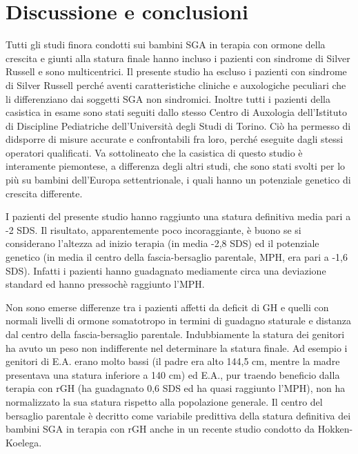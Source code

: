 \chapter{Discussione e conclusioni}


Tutti gli studi finora condotti sui bambini SGA in terapia con ormone della crescita e giunti alla statura finale hanno incluso i pazienti con sindrome di Silver Russell e sono multicentrici. Il presente studio ha escluso i pazienti con sindrome di Silver Russell perché aventi caratteristiche cliniche e auxologiche peculiari che li differenziano dai soggetti SGA non sindromici. Inoltre tutti i pazienti della casistica in esame sono stati seguiti dallo stesso Centro di Auxologia dell'Istituto di Discipline Pediatriche dell'Università degli Studi di Torino. Ciò ha permesso di didsporre di misure accurate e confrontabili fra loro, perché eseguite dagli stessi operatori qualificati. Va sottolineato che la casistica di questo studio è interamente piemontese, a differenza degli altri studi, che sono stati svolti per lo più su bambini dell'Europa settentrionale, i quali hanno un potenziale genetico di crescita differente.

I pazienti del presente studio hanno raggiunto una statura definitiva media pari a -2 SDS. Il risultato, apparentemente poco incoraggiante, è buono se si considerano l'altezza ad inizio terapia (in media -2,8 SDS) ed il potenziale genetico (in media il centro della fascia-bersaglio parentale, MPH, era pari a -1,6 SDS). Infatti i pazienti hanno guadagnato mediamente circa una deviazione standard ed hanno pressochè raggiunto l'MPH. 

Non sono emerse differenze tra i pazienti affetti da deficit di GH e quelli con normali livelli di ormone somatotropo in termini di guadagno staturale e distanza dal centro della fascia-bersaglio parentale. Indubbiamente la statura dei genitori ha avuto un peso non indifferente nel determinare la statura finale. Ad esempio i genitori di E.A. erano molto bassi (il padre era alto 144,5 cm, mentre la madre presentava una statura inferiore a 140 cm) ed E.A., pur traendo beneficio dalla terapia con rGH (ha guadagnato 0,6 SDS ed ha quasi raggiunto l'MPH), non ha normalizzato la sua statura rispetto alla popolazione generale.
Il centro del bersaglio parentale è decritto come variabile predittiva della statura definitiva dei bambini SGA in terapia con rGH anche in un recente studio condotto da Hokken-Koelega\cite{de2008prediction}.

